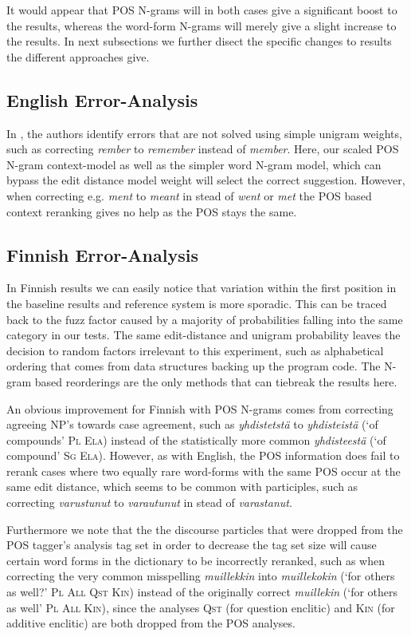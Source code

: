 \documentclass{llncs}
\begin{document}
It would appear that POS N-grams will in both cases give a significant boost to
the results, whereas the word-form N-grams will merely give a slight increase to
the results. In next subsections we further disect the specific changes to
results the different approaches give.

\subsection{English Error-Analysis}

In \cite{norvig/2010}, the authors identify errors that are not solved using
simple unigram weights, such as correcting \emph{rember} to \emph{remember}
instead of \emph{member}. Here, our scaled POS N-gram context-model as well
as the simpler word N-gram model, which can bypass the
edit distance model weight will select the correct suggestion. However, when
correcting e.g.  \emph{ment} to \emph{meant} in stead of \emph{went} or
\emph{met} the POS based context reranking gives no help as the POS stays the
same.
 
\subsection{Finnish Error-Analysis}

In Finnish results we can easily notice that variation within the first
position in the baseline results and reference system is more sporadic. This
can be traced back to the fuzz factor caused by a majority of probabilities
falling into the same category in our tests. The same edit-distance and unigram
probability leaves the decision to random factors irrelevant to this
experiment, such as alphabetical ordering that comes from data structures
backing up the program code. The N-gram based reorderings are the only methods
that can tiebreak the results here.

An obvious improvement for Finnish with POS N-grams comes from correcting
agreeing NP's towards case agreement, such as \emph{yhdistetstä} to
\emph{yhdisteistä} (`of compounds' \textsc{Pl Ela}) instead of the statistically
more common \emph{yhdisteestä} (`of compound' \textsc{Sg Ela}). However, as
with English, the POS information does fail to rerank cases where two equally
rare word-forms with the same POS occur at the same edit distance, which seems
to be common with participles, such as correcting \emph{varustunut} to
\emph{varautunut} in stead of \emph{varastanut}.

Furthermore we note that the the discourse particles that were dropped from the
POS tagger's analysis tag set in order to decrease the tag set size will cause
certain word forms in the dictionary to be incorrectly reranked, such as when
correcting the very common misspelling \emph{muillekkin} into
\emph{muillekokin} (`for others as well?' \textsc{Pl All Qst Kin}) instead of
the originally correct \emph{muillekin} (`for others as well' \textsc{Pl All
Kin}), since the analyses \textsc{Qst} (for question enclitic) and \textsc{Kin}
(for additive enclitic) are both dropped from the POS analyses.
\end{document}
